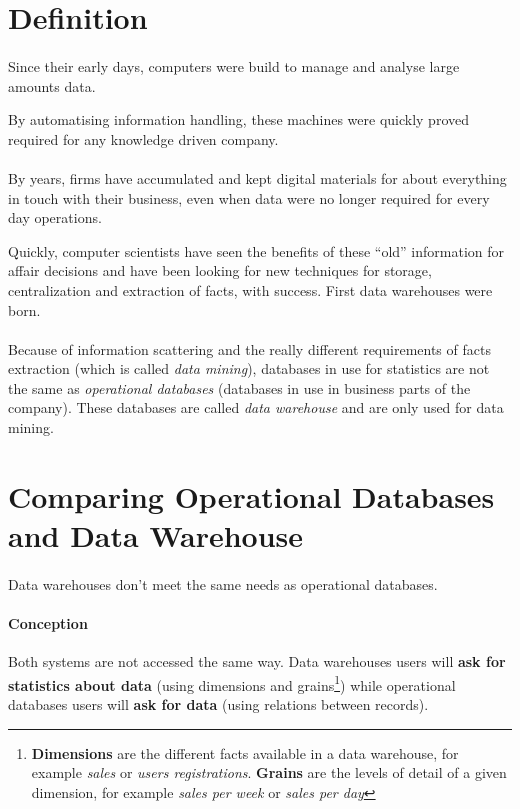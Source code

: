 \documentclass[a4paper,12pt]{article}
\begin{document}
\newpage

\section{Definition}
    \paragraph{}
    Since their early days, computers were build to manage and analyse large
amounts data.

    By automatising information handling, these machines were quickly proved
required for any knowledge driven company.

    \paragraph{}
    By years, firms have accumulated and kept digital materials for about
everything in touch with their business, even when data were no longer
required for every day operations.

    Quickly, computer scientists have seen the benefits of these ``old''
information for affair decisions and have been looking for new techniques for
storage, centralization and extraction of facts, with success. First data
warehouses were born.

    \paragraph{}
    Because of information scattering and the really different requirements of
facts extraction (which is called \textit{data mining}), databases in use for
statistics are not the same as \textit{operational databases} (databases in
use in business parts of the company). These databases are called \textit{data
warehouse} and are only used for data mining.

\newpage

\section{Comparing Operational Databases and Data Warehouse}
    \paragraph{}
    Data warehouses don't meet the same needs as operational databases.

    \paragraph{Conception}
    Both systems are not accessed the same way. Data warehouses users will
\textbf{ask for statistics about data} (using dimensions and
grains\footnote{\textbf{Dimensions} are the different facts available in a data
warehouse, for example \textit{sales} or \textit{users registrations}.
\textbf{Grains} are the levels of detail of a given dimension, for example
\textit{sales per week} or \textit{sales per day}}) while operational databases
users will \textbf{ask for data} (using relations between records).
\end{document}
